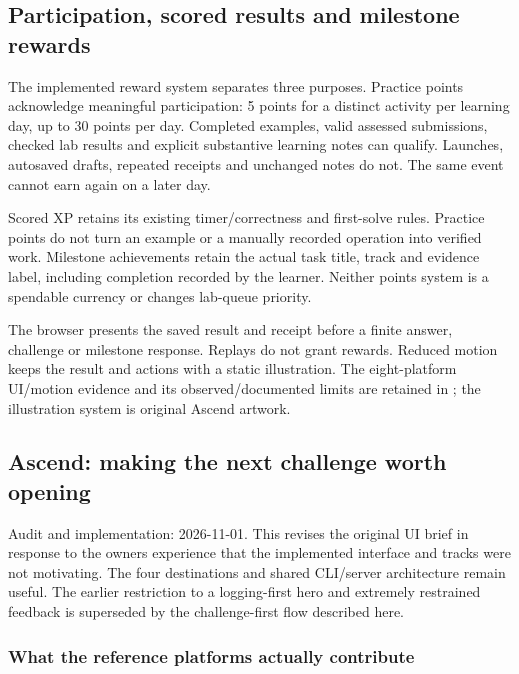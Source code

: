 \subsection{Participation, scored results and milestone rewards}
The implemented reward system separates three purposes. Practice points
acknowledge meaningful participation: 5 points for a distinct activity per
learning day, up to 30 points per day. Completed examples, valid assessed
submissions, checked lab results and explicit substantive learning notes can
qualify. Launches, autosaved drafts, repeated receipts and unchanged notes do
not. The same event cannot earn again on a later day.

Scored XP retains its existing timer/correctness and first-solve rules.
Practice points do not turn an example or a manually recorded operation into
verified work. Milestone achievements retain the actual task title, track and
evidence label, including completion recorded by the learner. Neither points
system is a spendable currency or changes lab-queue priority.

The browser presents the saved result and receipt before a finite answer,
challenge or milestone response. Replays do not grant rewards. Reduced motion
keeps the result and actions with a static illustration. The eight-platform
UI/motion evidence and its observed/documented limits are retained in
; the illustration system is
original Ascend artwork.
\hypertarget{ascend-making-the-next-challenge-worth-opening}{%
\subsection{Ascend: making the next challenge worth
opening}\label{ascend-making-the-next-challenge-worth-opening}}

Audit and implementation: 2026-11-01. This revises the original UI brief
in response to the owner\textquotesingle s experience that the
implemented interface and tracks were not motivating. The four
destinations and shared CLI/server architecture remain useful. The
earlier restriction to a logging-first hero and extremely restrained
feedback is superseded by the challenge-first flow described here.

\hypertarget{what-the-reference-platforms-actually-contribute}{%
\subsubsection{What the reference platforms actually
contribute}\label{what-the-reference-platforms-actually-contribute}}

